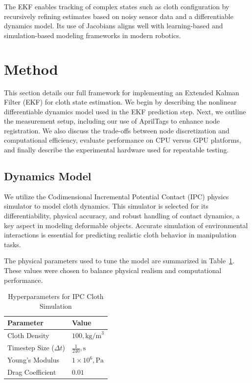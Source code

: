 The EKF enables tracking of complex states such as cloth configuration by recursively refining estimates based on noisy sensor data and a differentiable dynamics model. Its use of Jacobians aligns well with learning-based and simulation-based modeling frameworks in modern robotics.

\section{Method}
This section details our full framework for implementing an Extended Kalman Filter (EKF) for cloth state estimation. We begin by describing the nonlinear differentiable dynamics model used in the EKF prediction step. Next, we outline the measurement setup, including our use of AprilTags to enhance node registration. We also discuss the trade-offs between node discretization and computational efficiency, evaluate performance on CPU versus GPU platforms, and finally describe the experimental hardware used for repeatable testing.

\subsection{Dynamics Model}
We utilize the Codimensional Incremental Potential Contact (IPC) physics simulator to model cloth dynamics. This simulator is selected for its differentiability, physical accuracy, and robust handling of contact dynamics, a key aspect in modeling deformable objects. Accurate simulation of environmental interactions is essential for predicting realistic cloth behavior in manipulation tasks.

The physical parameters used to tune the model are summarized in Table~\ref{tab:params}. These values were chosen to balance physical realism and computational performance.
\begin{table}[h]
\centering
\caption{Hyperparameters for IPC Cloth Simulation}
\label{tab:params}
\begin{tabular}{ll}
\toprule
\textbf{Parameter} & \textbf{Value} \\
\midrule
Cloth Density & $100,\mathrm{kg/m}^3$ \\
Timestep Size ($\Delta t$) & $\frac{1}{240},\mathrm{s}$ \\
Young's Modulus & $1 \times 10^6,\mathrm{Pa}$ \\
Drag Coefficient & $0.01$ \\
\bottomrule
\end{tabular}
\vspace{-30pt}
\end{table}
